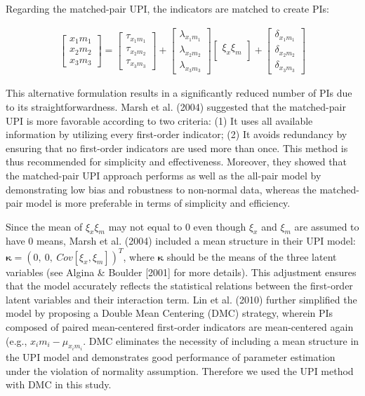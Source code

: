 \documentclass[
  man]{apa6}
\begin{document}
Regarding the matched-pair UPI, the indicators are matched to create PIs:

\begin{align}
    \begin{bmatrix}
        x_{1}m_{1} \\
        x_{2}m_{2} \\
        x_{3}m_{3}
    \end{bmatrix} =
    \begin{bmatrix}
        \tau_{x_{1}m_{1}} \\
        \tau_{x_{2}m_{2}} \\ 
        \tau_{x_{3}m_{3}}
    \end{bmatrix} + 
    \begin{bmatrix}
        \lambda_{x_{1}m_{1}} \\
        \lambda_{x_{2}m_{2}} \\ 
        \lambda_{x_{3}m_{3}} 
    \end{bmatrix}
    \begin{bmatrix}
        \xi_{x}\xi_{m} \\
    \end{bmatrix} +
    \begin{bmatrix}
        \delta_{x_{1}m_{1}} \\
        \delta_{x_{2}m_{2}} \\ 
        \delta_{x_{3}m_{3}}
    \end{bmatrix}
\end{align}

This alternative formulation results in a significantly reduced number of PIs due to its straightforwardness. Marsh et al. (2004) suggested that the matched-pair UPI is more favorable according to two criteria: (1) It uses all available information by utilizing every first-order indicator; (2) It avoids redundancy by ensuring that no first-order indicators are used more than once. This method is thus recommended for simplicity and effectiveness. Moreover, they showed that the matched-pair UPI approach performs as well as the all-pair model by demonstrating low bias and robustness to non-normal data, whereas the matched-pair model is more preferable in terms of simplicity and efficiency.

Since the mean of \(\xi_{x}\xi_{m}\) may not equal to 0 even though \(\xi_{x}\) and \(\xi_{m}\) are assumed to have 0 means, Marsh et al. (2004) included a mean structure in their UPI model: \(\mathbf{\kappa} = (0,\ 0,\ Cov[\xi_{x}, \xi_{m}])^T\), where \(\mathbf{\kappa}\) should be the means of the three latent variables (see Algina \& Boulder {[}2001{]} for more details). This adjustment ensures that the model accurately reflects the statistical relations between the first-order latent variables and their interaction term. Lin et al. (2010) further simplified the model by proposing a Double Mean Centering (DMC) strategy, wherein PIs composed of paired mean-centered first-order indicators are mean-centered again (e.g., \(x_{i}m_{i} - \mu_{x_{i}m_{i}}\). DMC eliminates the necessity of including a mean structure in the UPI model and demonstrates good performance of parameter estimation under the violation of normality assumption. Therefore we used the UPI method with DMC in this study.
\end{document}

